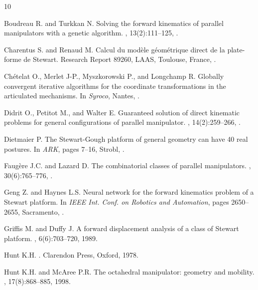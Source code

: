 \begin{thebibliography}{10}

Boudreau R. and Turkkan N.
\newblock Solving the forward kinematics of parallel manipulators with a
  genetic algorithm.
, 13(2):111--125,
  .

Charentus S. and Renaud M.
\newblock Calcul du mod\`ele g\'eom\'etrique direct de la plate-forme de
  {Stewart}.
\newblock Research Report 89260, LAAS, Toulouse, France,
  .

Ch\'etelat O., Merlet J-P., Myszkorowski P., and Longchamp R.
\newblock Globally convergent iterative algorithms for the coordinate
  transformations in the articulated mechanisms.
\newblock In {\em Syroco}, Nantes, .

Didrit O., Petitot M., and Walter E.
\newblock Guaranteed solution of direct kinematic problems for general
  configurations of parallel manipulator.
, 14(2):259--266,
  .

Dietmaier P.
\newblock The {Stewart-Gough} platform of general geometry can have 40 real
  postures.
\newblock In {\em ARK}, pages 7--16, Strobl,
  .

Faug\`ere J.C. and Lazard D.
\newblock The combinatorial classes of parallel manipulators.
, 30(6):765--776,
  .

Geng Z. and Haynes L.S.
\newblock Neural network for the forward kinematics problem of a {Stewart}
  platform.
\newblock In {\em IEEE Int. Conf. on Robotics and Automation}, pages
  2650--2655, Sacramento, .

Griffis M. and Duffy J.
\newblock A forward displacement analysis of a class of {Stewart} platform.
, 6(6):703--720, 1989.

Hunt K.H.
.
\newblock Clarendon Press, Oxford, 1978.

Hunt K.H. and McAree P.R.
\newblock The octahedral manipulator: geometry and mobility.
, 17(8):868--885, 1998.


\end{thebibliography}

